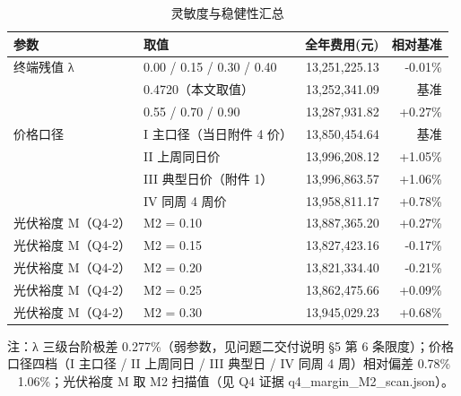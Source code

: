 \begin{table}[htbp]
\centering
\caption{灵敏度与稳健性汇总}
\label{tab:sens}
\small
\setlength{\tabcolsep}{4pt}
\begin{tabular}{llrr}
\toprule
参数 & 取值 & 全年费用(元) & 相对基准 \\
\midrule
终端残值 λ & 0.00 / 0.15 / 0.30 / 0.40 & 13,251,225.13 & -0.01\% \\
 & 0.4720（本文取值） & 13,252,341.09 & 基准 \\
 & 0.55 / 0.70 / 0.90 & 13,287,931.82 & +0.27\% \\
价格口径 & I 主口径（当日附件 4 价） & 13,850,454.64 & 基准 \\
 & II 上周同日价 & 13,996,208.12 & +1.05\% \\
 & III 典型日价（附件 1） & 13,996,863.57 & +1.06\% \\
 & IV 同周 4 周价 & 13,958,811.17 & +0.78\% \\
光伏裕度 M（Q4-2） & M2 = 0.10 & 13,887,365.20 & +0.27\% \\
光伏裕度 M（Q4-2） & M2 = 0.15 & 13,827,423.16 & -0.17\% \\
光伏裕度 M（Q4-2） & M2 = 0.20 & 13,821,334.40 & -0.21\% \\
光伏裕度 M（Q4-2） & M2 = 0.25 & 13,862,475.66 & +0.09\% \\
光伏裕度 M（Q4-2） & M2 = 0.30 & 13,945,029.23 & +0.68\% \\
\bottomrule
\end{tabular}
\vspace{2pt}
\begin{flushleft}\footnotesize 注：λ 三级台阶极差 0.277\%（弱参数，见问题二交付说明 §5 第 6 条限度）；价格口径四档（I 主口径 / II 上周同日 / III 典型日 / IV 同周 4 周）相对偏差 0.78\% ~ 1.06\%；光伏裕度 M 取 M2 扫描值（见 Q4 证据 q4_margin_M2_scan.json）。\end{flushleft}
\end{table}

